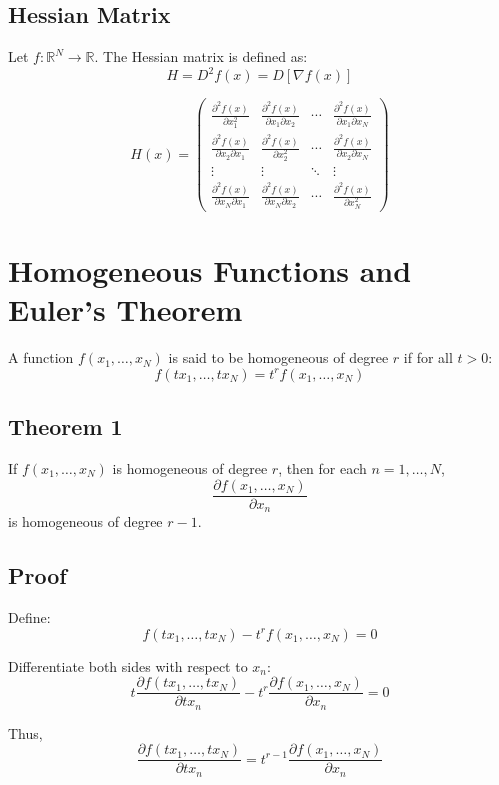 \subsection*{Hessian Matrix}

Let $f : \mathbb{R}^N \to \mathbb{R}$.  
The Hessian matrix is defined as:
\[
H = D^2 f(x) = D[\nabla f(x)]
\]

\[
H(x) =
\begin{pmatrix}
\frac{\partial^2 f(x)}{\partial x_1^2} & \frac{\partial^2 f(x)}{\partial x_1 \partial x_2} & \cdots & \frac{\partial^2 f(x)}{\partial x_1 \partial x_N} \\
\frac{\partial^2 f(x)}{\partial x_2 \partial x_1} & \frac{\partial^2 f(x)}{\partial x_2^2} & \cdots & \frac{\partial^2 f(x)}{\partial x_2 \partial x_N} \\
\vdots & \vdots & \ddots & \vdots \\
\frac{\partial^2 f(x)}{\partial x_N \partial x_1} & \frac{\partial^2 f(x)}{\partial x_N \partial x_2} & \cdots & \frac{\partial^2 f(x)}{\partial x_N^2}
\end{pmatrix}
\]

\section{Homogeneous Functions and Euler's Theorem}

A function $f(x_1, \dots, x_N)$ is said to be homogeneous of degree $r$ if for all $t > 0$:
\[
f(t x_1, \dots, t x_N) = t^r f(x_1, \dots, x_N)
\]

\begin{tcolorbox}[breakable, colback=white]

\subsection*{Theorem 1}

If $f(x_1, \dots, x_N)$ is homogeneous of degree $r$, then for each $n = 1, \dots, N$,
\[
\frac{\partial f(x_1, \dots, x_N)}{\partial x_n}
\]
is homogeneous of degree $r - 1$.


\subsection*{Proof}

Define:
\[
f(t x_1, \dots, t x_N) - t^r f(x_1, \dots, x_N) = 0
\]

Differentiate both sides with respect to $x_n$:
\[
t \frac{\partial f(t x_1, \dots, t x_N)}{\partial tx_n}
- t^r \frac{\partial f(x_1, \dots, x_N)}{\partial x_n} = 0
\]

Thus,
\[
\frac{\partial f(t x_1, \dots, t x_N)}{\partial tx_n}
= t^{r-1} \frac{\partial f(x_1, \dots, x_N)}{\partial x_n}
\]


\end{tcolorbox}

